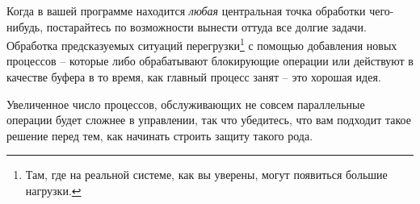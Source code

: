 \documentclass[11pt, oneside]{book}   	%
\begin{document}
Когда в вашей программе находится \emph{любая} центральная точка обработки чего-нибудь, постарайтесь по возможности вынести оттуда все долгие задачи. Обработка предсказуемых ситуаций перегрузки\footnote{Там, где на реальной системе, как вы уверены, могут появиться большие нагрузки.} с помощью добавления новых процессов -- которые либо обрабатывают блокирующие операции или действуют в качестве буфера в то время, как главный процесс занят -- это хорошая идея.

Увеличенное число процессов, обслуживающих не совсем параллельные операции будет сложнее в управлении, так что убедитесь, что вам подходит такое решение перед тем, как начинать строить защиту такого рода.
\end{document}
